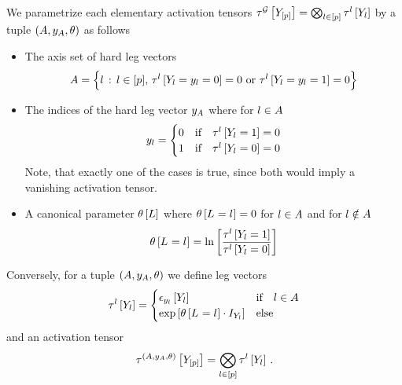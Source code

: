 We parametrize each elementary activation tensors $\tau^{\mathcal{G}}\left[Y_{[p]}\right]=\bigotimes_{l\in[p]}\tau^{l}\left[Y_{l}\right]$ by a tuple
$(A,y_{A},\theta)$ as follows
\begin{itemize}
    \item The axis set of hard leg vectors
    \begin{align*}
        A = \Big\{ l \,:\, l\in[p] ,\, \tau^{l}\left[Y_{l}=y_{l}=0\right]=0 \,\,\text{or}\,\,  \tau^{l}\left[Y_{l}=y_{l}=1\right]=0  \Big\}
    \end{align*}
    \item The indices of the hard leg vector $y_{A}$ where for $l\in A$
    \begin{align*}
        y_{l} =
        \begin{cases}
            0 & \text{if}\quad \tau^{l}\left[Y_{l}=1\right]=0 \\
            1 & \text{if}\quad \tau^{l}\left[Y_{l}=0\right]=0
        \end{cases}
    \end{align*}
    Note, that exactly one of the cases is true, since both would imply a vanishing activation tensor.
    \item A canonical parameter $\theta\left[L\right]$ where $\theta\left[L_{}=l_{}\right]=0$ for $l\in A$ and for $l\notin A$
    \begin{align*}
        \theta\left[L_{}=l_{}\right] = \ln \left[ 
            \frac{\tau^{l}\left[Y_{l}=1\right]}{\tau^{l}\left[Y_{l}=0\right]}
         \right]
    \end{align*}
\end{itemize}
Conversely, for a tuple $(A,y_{A},\theta)$ we define leg vectors
\begin{align*}
    \tau^{l}\left[Y_{l}\right] =
    \begin{cases}
        \epsilon_{y_{l}}\left[Y_{l}\right] & \text{if} \quad l\in A \\
        \mathrm{exp}\left[\theta\left[L_{}=l_{}\right]\cdot I_{Y_{l}}\right] & \text{else}
    \end{cases}
\end{align*}
and an activation tensor
\begin{align*}
    \tau^{(A,y_{A},\theta)}\left[Y_{[p]}\right]
    =\bigotimes_{l\in[p]}\tau^{l}\left[Y_{l}\right] \, .
\end{align*}


